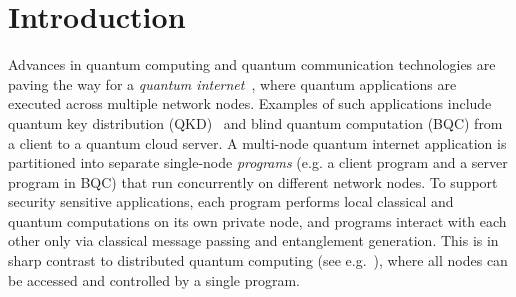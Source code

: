 \section{Introduction}
\label{qoala:sec:introduction}



Advances in quantum computing and quantum communication technologies are paving the way for a \textit{quantum internet}~\cite{wehner2018quantum, kimble2008quantum}, where quantum applications are executed across multiple network nodes.
Examples of such applications include quantum key distribution (QKD)~\cite{bennett2014quantum, ekert1991quantum} and blind quantum computation (BQC) \cite{broadbent2009universal, arrighi2006blind} from a client to a quantum cloud server.
A multi-node quantum internet application is partitioned into separate single-node \textit{programs} (e.g. a client program and a server program in BQC) that run concurrently on different network nodes. To support security sensitive applications, each program performs local classical and quantum computations on its own private node, and programs interact with each other only via classical message passing and entanglement generation. This is in sharp contrast to distributed quantum computing (see e.g.~\cite{caleffi_distributed_2022}), where all nodes can be accessed and controlled by a single program. 



